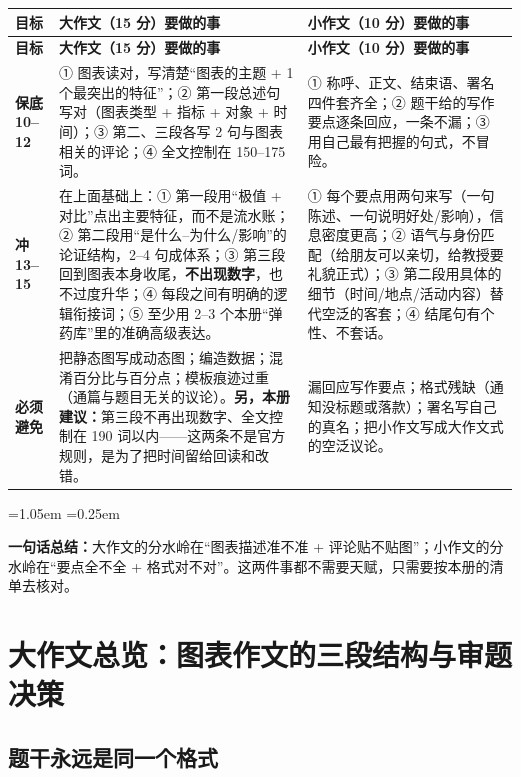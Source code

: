 \documentclass[11pt,a4paper]{ctexart}
\newenvironment{note}{%
  \par\addvspace{5pt}%
  \begin{list}{}{\leftmargin=1.05em \rightmargin=0.25em \listparindent=0pt
    \itemindent=0pt \topsep=0pt \parsep=2pt \itemsep=2pt \partopsep=0pt}%
  \item\relax\small\color{ink}%
}{%
  \end{list}\addvspace{5pt}%
}
\begin{document}
\begin{longtable}{C{1.8cm} L{6.3cm} L{7.5cm}}
\toprule
\textbf{目标} & \textbf{大作文（15 分）要做的事} & \textbf{小作文（10 分）要做的事}\\
\midrule
\endfirsthead
\toprule
\textbf{目标} & \textbf{大作文（15 分）要做的事} & \textbf{小作文（10 分）要做的事}\\
\midrule
\endhead
\textbf{保底 10--12} & ① 图表读对，写清楚“图表的主题 + 1 个最突出的特征”；② 第一段总述句写对（图表类型 + 指标 + 对象 + 时间）；③ 第二、三段各写 2 句与图表相关的评论；④ 全文控制在 150--175 词。 & ① 称呼、正文、结束语、署名四件套齐全；② 题干给的写作要点逐条回应，一条不漏；③ 用自己最有把握的句式，不冒险。\\
\midrule
\textbf{冲 13--15} & 在上面基础上：① 第一段用“极值 + 对比”点出主要特征，而不是流水账；② 第二段用“是什么--为什么/影响”的论证结构，2--4 句成体系；③ 第三段回到图表本身收尾，\textbf{不出现数字}，也不过度升华；④ 每段之间有明确的逻辑衔接词；⑤ 至少用 2--3 个本册“弹药库”里的准确高级表达。 & ① 每个要点用两句来写（一句陈述、一句说明好处/影响），信息密度更高；② 语气与身份匹配（给朋友可以亲切，给教授要礼貌正式）；③ 第二段用具体的细节（时间/地点/活动内容）替代空泛的客套；④ 结尾句有个性、不套话。\\
\midrule
\textbf{必须避免} & 把静态图写成动态图；编造数据；混淆百分比与百分点；模板痕迹过重（通篇与题目无关的议论）。\textbf{另，本册建议：}第三段不再出现数字、全文控制在 190 词以内——这两条不是官方规则，是为了把时间留给回读和改错。 & 漏回应写作要点；格式残缺（通知没标题或落款）；署名写自己的真名；把小作文写成大作文式的空泛议论。\\
\bottomrule
\end{longtable}

\begin{note}
\textbf{一句话总结：}大作文的分水岭在“图表描述准不准 + 评论贴不贴图”；小作文的分水岭在“要点全不全 + 格式对不对”。这两件事都不需要天赋，只需要按本册的清单去核对。
\end{note}

\clearpage

\section{大作文总览：图表作文的三段结构与审题决策}

\subsection{题干永远是同一个格式}
\end{document}
